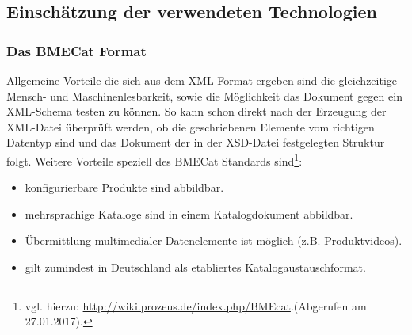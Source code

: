 				
		

		

	
	\subsection{Einschätzung der verwendeten Technologien}

	
	\subsubsection{Das BMECat Format}
	
	Allgemeine Vorteile die sich aus dem XML-Format ergeben sind die gleichzeitige Mensch- und Maschinenlesbarkeit, sowie die Möglichkeit das Dokument gegen ein XML-Schema testen zu können. So kann schon direkt nach der Erzeugung der XML-Datei überprüft werden, ob die geschriebenen Elemente vom richtigen Datentyp sind und das Dokument der in der XSD-Datei festgelegten Struktur folgt. Weitere Vorteile speziell des BMECat Standards sind\footnote{vgl. hierzu: \url{http://wiki.prozeus.de/index.php/BMEcat}.(Abgerufen am 27.01.2017).}:
	
	\begin{itemize}[noitemsep]
	\item konfigurierbare Produkte sind abbildbar.
	\item mehrsprachige Kataloge sind in einem Katalogdokument abbildbar.
	\item Übermittlung multimedialer Datenelemente ist möglich (z.B. Produktvideos).
	\item gilt zumindest in Deutschland als etabliertes Katalogaustauschformat.
	\end{itemize}
	
